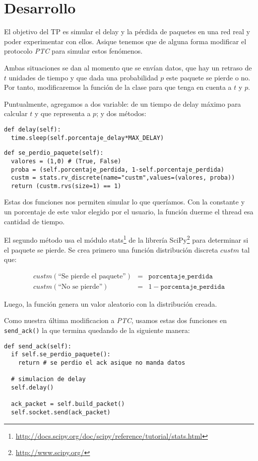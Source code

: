 \section{Desarrollo}

El objetivo del TP es simular el delay y la p\'erdida de paquetes en una red real y poder experimentar con ellos. Asique tenemos que de alguna forma modificar el protocolo \emph{PTC} para simular estos fen\'omenos. 

Ambas situaciones se dan al momento que se env\'ian datos, que hay un retraso de $t$ unidades de tiempo y que dada una probabilidad $p$ este paquete se pierde o no. Por tanto, modificaremos la funci\'on  de la clase  para que tenga en cuenta a $t$ y $p$. 

Puntualmente, agregamos a  dos variable:  de un tiempo de delay m\'aximo para calcular $t$ y  que representa a $p$; y dos m\'etodos: 

\begin{verbatim}
def delay(self): 
  time.sleep(self.porcentaje_delay*MAX_DELAY)
\end{verbatim}

\begin{verbatim}
def se_perdio_paquete(self):
  valores = (1,0) # (True, False)
  proba = (self.porcentaje_perdida, 1-self.porcentaje_perdida)
  custm = stats.rv_discrete(name="custm",values=(valores, proba))
  return (custm.rvs(size=1) == 1)
\end{verbatim}

Estas dos funciones nos permiten simular lo que quer\'iamos. Con la constante  y un porcentaje de este valor elegido por el usuario, la funci\'on  duerme el thread esa cantidad de tiempo. 

El segundo m\'etodo usa el m\'odulo stats\footnote{\url{http://docs.scipy.org/doc/scipy/reference/tutorial/stats.html}} de la librer\'ia SciPy\footnote{\url{http://www.scipy.org/}} para determinar si el paquete se pierde. Se crea primero una funci\'on distribuci\'on discreta $custm$ tal que: 

\begin{eqnarray*}
 custm(\text{``Se pierde el paquete''}) &=& \texttt{porcentaje\_perdida} \\
 custm(\text{``No se pierde''}) &=& 1 - \texttt{porcentaje\_perdida}
\end{eqnarray*}

Luego, la funci\'on  genera un valor aleatorio con la distribuci\'on creada.  

Como nuestra \'ultima modificacion a \emph{PTC}, usamos estas dos funciones en \texttt{send\_ack()} la que termina quedando de la siguiente manera:

\begin{verbatim}
def send_ack(self):
  if self.se_perdio_paquete():
    return # se perdio el ack asique no manda datos

  # simulacion de delay
  self.delay()

  ack_packet = self.build_packet()
  self.socket.send(ack_packet)
\end{verbatim}